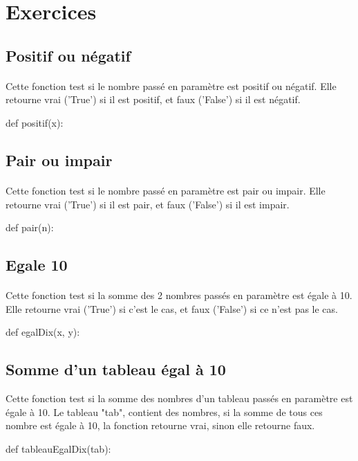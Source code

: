 \section{Exercices}






\subsection{Positif ou négatif}


\paragraph{}
Cette fonction test si le nombre passé en paramètre est positif ou négatif.
Elle retourne vrai ('True') si il est positif, et faux ('False') si il est négatif.
\begin{pythonCode}
def positif(x):
\end{pythonCode}


\subsection{Pair ou impair}


\paragraph{}
Cette fonction test si le nombre passé en paramètre est pair ou impair.
Elle retourne vrai ('True') si il est pair, et faux ('False') si il est impair.
\begin{pythonCode}
def pair(n):
\end{pythonCode}



\subsection{Egale 10}


\paragraph{}
Cette fonction test si la somme des 2 nombres passés en paramètre est égale à 10.
Elle retourne vrai ('True') si c'est le cas, et faux ('False') si ce n'est pas le cas.
\begin{pythonCode}
def egalDix(x, y):
\end{pythonCode}




\subsection{Somme d'un tableau égal à 10}
Cette fonction test si la somme des nombres d'un tableau passés en paramètre est égale à 10.
Le tableau "tab", contient des nombres, si la somme de tous ces nombre est égale à 10, la fonction retourne vrai, sinon elle retourne faux.
\begin{pythonCode}
def tableauEgalDix(tab):
\end{pythonCode}





